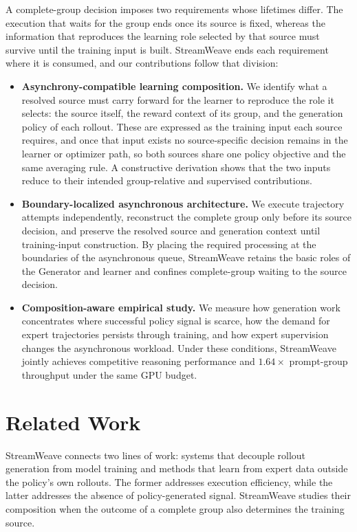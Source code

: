 \documentclass[letterpaper]{article}
\begin{document}
A complete-group decision imposes two requirements whose lifetimes differ.
The execution that waits for the group ends once its source is fixed, whereas the information that reproduces the learning role selected by that source must survive until the training input is built.
StreamWeave ends each requirement where it is consumed, and our contributions follow that division:
\begin{itemize}
  \item \textbf{Asynchrony-compatible learning composition.}
  We identify what a resolved source must carry forward for the learner to reproduce the role it selects: the source itself, the reward context of its group, and the generation policy of each rollout.
  These are expressed as the training input each source requires, and once that input exists no source-specific decision remains in the learner or optimizer path, so both sources share one policy objective and the same averaging rule.
  A constructive derivation shows that the two inputs reduce to their intended group-relative and supervised contributions.

  \item \textbf{Boundary-localized asynchronous architecture.}
  We execute trajectory attempts independently, reconstruct the complete group only before its source decision, and preserve the resolved source and generation context until training-input construction.
  By placing the required processing at the boundaries of the asynchronous queue, StreamWeave retains the basic roles of the Generator and learner and confines complete-group waiting to the source decision.

  \item \textbf{Composition-aware empirical study.}
  We measure how generation work concentrates where successful policy signal is scarce, how the demand for expert trajectories persists through training, and how expert supervision changes the asynchronous workload.
  Under these conditions, StreamWeave jointly achieves competitive reasoning performance and $1.64\times$ prompt-group throughput under the same GPU budget.
\end{itemize}

\section{Related Work}
\label{sec:related-work}

StreamWeave connects two lines of work: systems that decouple rollout generation from model training and methods that learn from expert data outside the policy's own rollouts.
The former addresses execution efficiency, while the latter addresses the absence of policy-generated signal.
StreamWeave studies their composition when the outcome of a complete group also determines the training source.
\end{document}
